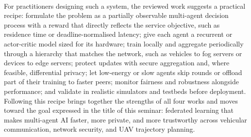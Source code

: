 \documentclass[12pt,a4paper,final]{extreport}
\begin{document}
\paragraph{} For practitioners designing such a system, the reviewed work suggests a practical recipe: formulate the problem as a partially observable multi-agent decision process with a reward that directly reflects the service objective, such as residence time or deadline-normalised latency; give each agent a recurrent or actor-critic model sized for its hardware; train locally and aggregate periodically through a hierarchy that matches the network, such as vehicles to fog servers or devices to edge servers; protect updates with secure aggregation and, where feasible, differential privacy; let low-energy or slow agents skip rounds or offload part of their training to faster peers; monitor fairness and robustness alongside performance; and validate in realistic simulators and testbeds before deployment. Following this recipe brings together the strengths of all four works and moves toward the goal expressed in the title of this seminar: federated learning that makes multi-agent AI faster, more private, and more trustworthy across vehicular communication, network security, and UAV trajectory planning.
\end{document}
